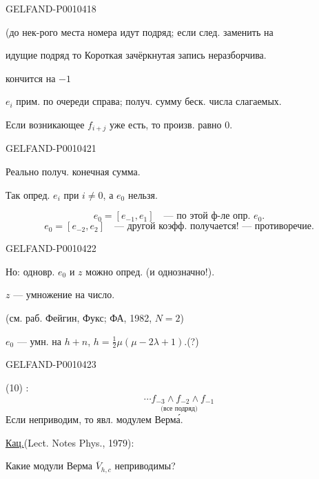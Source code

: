 \begin{GelfandAdjacentEvidence}{GELFAND-P001041}{8}


(до нек-рого места номера идут подряд; если след. заменить на

идущие подряд то Короткая зачёркнутая запись неразборчива.
\end{GelfandAdjacentEvidence}

кончится на $-1$

$e_i$ прим. по очереди справа; получ. сумму беск. числа слагаемых.

Если возникающее $f_{i+j}$ уже есть, то произв. равно $0$.


\begin{GelfandAdjacentEvidence}{GELFAND-P001042}{1}

Реально получ. конечная сумма.

Так опред. $e_i$ при $i\ne0$, а $e_0$ нельзя.

\[
e_0=[e_{-1},e_1]\quad\text{— по этой ф-ле опр. }e_0.
\]
\[
e_0=[e_{-2},e_2]\quad\text{— другой коэфф. получается! — противоречие.}
\]
\end{GelfandAdjacentEvidence}
\begin{GelfandAdjacentEvidence}{GELFAND-P001042}{2}


Но: одновр. $e_0$ и $z$ можно опред. (и однозначно!).

$z$ — умножение на число.

(см. раб. Фейгин, Фукс; ФА, 1982, $N=2$)

$e_0$ — умн. на $h+n$,\quad
$h=\tfrac12\mu(\mu-2\lambda+1)$.\quad (?)
\end{GelfandAdjacentEvidence}
\begin{GelfandAdjacentEvidence}{GELFAND-P001042}{3}


(10) :
\[
\underset{\text{(все подряд)}}{\cdots f_{-3}\wedge f_{-2}\wedge f_{-1}}
\]
Если неприводим, то явл. модулем Верма́.

\underline{Кац.}\quad (Lect. Notes Phys., 1979):

Какие модули Верма $\overline V_{h,c}$ неприводимы?
\end{GelfandAdjacentEvidence}
